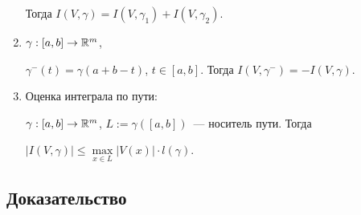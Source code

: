 \documentclass{article}
\begin{document}
\begin{enumerate}
                Тогда $I \left( V, \gamma \right) = I \left( V, \gamma_1 \right) + I \left( V, \gamma_2 \right)$.
            
            \item $\gamma : [a, b] \rightarrow \mathbb{R}^m$,
            
                $\gamma^- (t) = \gamma(a + b - t)$, $t \in [a, b]$. Тогда $I \left( V, \gamma^- \right) = - I \left( V, \gamma \right)$.
                
            \item Оценка интеграла по пути:
            
                $\gamma : [a, b] \rightarrow \mathbb{R}^m$, $L := \gamma \left( [a, b] \right)$~--- носитель пути. Тогда
                
                $\left| I \left( V, \gamma \right) \right| \leqslant \max\limits_{x \in L} \left| V(x) \right| \cdot l (\gamma)$.
                
        \end{enumerate}
        
        \subsection{Доказательство}
        
\end{document}
